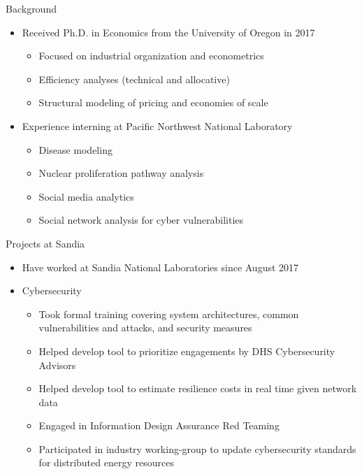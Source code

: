 \documentclass{beamer}
\begin{document}
	
\begin{frame}{Background}
\begin{itemize}
	\item Received Ph.D. in Economics from the University of Oregon in 2017
		\begin{itemize}
			\item Focused on industrial organization and econometrics
			\item Efficiency analyses (technical and allocative)
			\item Structural modeling of pricing and economies of scale
		\end{itemize}
	\item Experience interning at Pacific Northwest National Laboratory
		\begin{itemize}
			\vspace*{-3ex}
			\item Disease modeling
			\item Nuclear proliferation pathway analysis
			\item Social media analytics
			\item Social network analysis for cyber vulnerabilities
		\end{itemize}
\end{itemize}
\end{frame}

\begin{frame}{Projects at Sandia}
\begin{itemize}
	\item Have worked at Sandia National Laboratories since August 2017
	\item Cybersecurity
		\begin{itemize}
			\item Took formal training covering system architectures, common vulnerabilities and attacks, and security measures
			\item Helped develop tool to prioritize engagements by DHS Cybersecurity Advisors
			\item Helped develop tool to estimate resilience costs in real time given network data
			\item Engaged in Information Design Assurance Red Teaming
			\item Participated in industry working-group to update cybersecurity standards for distributed energy resources
		\end{itemize}
\end{itemize}
\end{frame}
\end{document}
